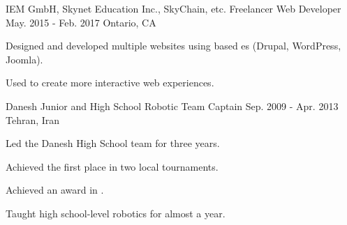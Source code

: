 

\begin{cventries}

    \cventry
    {IEM GmbH, Skynet Education Inc., SkyChain, etc.} %
    {Freelancer Web Developer} %
    {May. 2015 - Feb. 2017} %
    {Ontario, CA} %
    {
      \begin{cvitems} %
        \item {Designed and developed multiple websites using  based es (Drupal, WordPress, Joomla).}
          \begin{cvsubitems}
            \item {Used  to create more interactive web experiences.}
          \end{cvsubitems}
      \end{cvitems}
    }

      \cventry
        {Danesh Junior and High School} %
        {Robotic Team Captain} %
        {Sep. 2009 - Apr. 2013} %
        {Tehran, Iran} %
        {
          \begin{cvitems} %
            \item {Led the Danesh High School team for three years.}
              \begin{cvsubitems}
                \item {Achieved the first place in two local tournaments.}
                \item {Achieved an award in .}
                \item {Taught high school-level robotics for almost a year.}
              \end{cvsubitems}
          \end{cvitems}
        }

\end{cventries}
